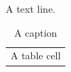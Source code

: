 \documentclass{book}
\begin{document}
A text line.

\begin{longtable}{m{}}

\caption{A caption}\\
\endfirsthead

A table cell\\

\end{longtable}
\end{document}

